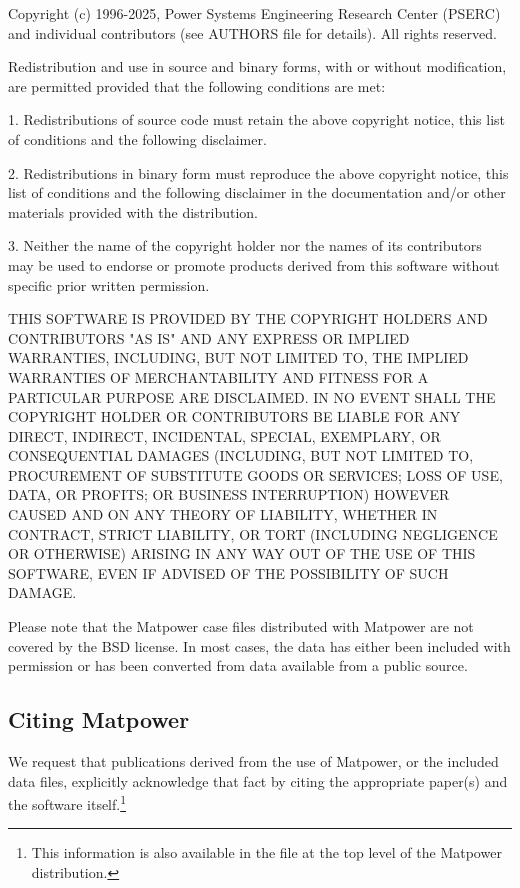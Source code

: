 \documentclass[12pt]{article}
\newcommand{\matpower}[0]{{\sc Matpower}}
\newcommand{\code}[1]{{\relsize{-0.5}{\tt{{#1}}}}}  %
\numberwithin{equation}{section}
\numberwithin{table}{section}
\numberwithin{figure}{section}
\begin{document}
\begin{Notice}
Copyright (c) 1996-2025, Power Systems Engineering Research Center
(PSERC) and individual contributors (see AUTHORS file for details).
All rights reserved.

Redistribution and use in source and binary forms, with or without
modification, are permitted provided that the following conditions
are met:

1. Redistributions of source code must retain the above copyright
notice, this list of conditions and the following disclaimer.

2. Redistributions in binary form must reproduce the above copyright
notice, this list of conditions and the following disclaimer in the
documentation and/or other materials provided with the distribution.

3. Neither the name of the copyright holder nor the names of its
contributors may be used to endorse or promote products derived from
this software without specific prior written permission.

THIS SOFTWARE IS PROVIDED BY THE COPYRIGHT HOLDERS AND CONTRIBUTORS
"AS IS" AND ANY EXPRESS OR IMPLIED WARRANTIES, INCLUDING, BUT NOT
LIMITED TO, THE IMPLIED WARRANTIES OF MERCHANTABILITY AND FITNESS
FOR A PARTICULAR PURPOSE ARE DISCLAIMED. IN NO EVENT SHALL THE
COPYRIGHT HOLDER OR CONTRIBUTORS BE LIABLE FOR ANY DIRECT, INDIRECT,
INCIDENTAL, SPECIAL, EXEMPLARY, OR CONSEQUENTIAL DAMAGES (INCLUDING,
BUT NOT LIMITED TO, PROCUREMENT OF SUBSTITUTE GOODS OR SERVICES;
LOSS OF USE, DATA, OR PROFITS; OR BUSINESS INTERRUPTION) HOWEVER
CAUSED AND ON ANY THEORY OF LIABILITY, WHETHER IN CONTRACT, STRICT
LIABILITY, OR TORT (INCLUDING NEGLIGENCE OR OTHERWISE) ARISING IN
ANY WAY OUT OF THE USE OF THIS SOFTWARE, EVEN IF ADVISED OF THE
POSSIBILITY OF SUCH DAMAGE.
\end{Notice}

Please note that the \matpower{} case files distributed with \matpower{} are not covered by the BSD license. In most cases, the data has either been included with permission or has been converted from data available from a public source.

\subsection{Citing \matpower{}}

We request that publications derived from the use of \matpower{}, or the
included data files, explicitly acknowledge that fact by citing the
appropriate paper(s) and the software itself.\footnote{This information is also available in the \code{CITATION} file at the top level of the \matpower{} distribution.}
\end{document}
